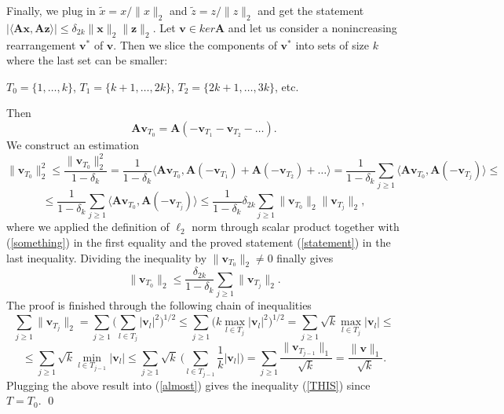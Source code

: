 \documentclass[11pt,american]{book} %
\theoremstyle{plain}
\theoremstyle{definition}
\begin{document}
Finally, we plug in $\tilde{x} = x/\lVert x\rVert_2$ and $\tilde{z} = z/\lVert z\rVert_2$ and get the statement $|\langle\bm{Ax},\bm{Az}\rangle| \leqslant \delta_{2k} \lVert \bm{x} \rVert_2 \lVert \bm{z} \rVert_2$.
\newline
\newline
Let $\bm{v} \in ker \bm{A}$ and let us consider a nonincreasing rearrangement $\bm{v}^*$ of $\bm{v}$. Then we slice the components of $\bm{v}^*$ into sets of size $k$ where the last set can be smaller:
\begin{center}
	$T_0 = \{1, \dots, k\}$, $T_1 = \{k+1, \dots, 2k\}$, $T_2 = \{2k+1, \dots, 3k\}$, etc.
\end{center}
Then
\begin{equation}
	\bm{A}\bm{v}_{T_0} = \bm{A}(-\bm{v}_{T_1}-\bm{v}_{T_2}- \dots). \label{something}
\end{equation}
We construct an estimation
\begin{equation*}
	\lVert\bm{v}_{T_0}\rVert_2^{2} \leqslant \frac{\lVert\bm{v}_{T_0}\rVert_2^{2}}{1-\delta_k} = \frac{1}{{1-\delta_k}}\langle\bm{A}\bm{v}_{T_0},\bm{A}(-\bm{v}_{T_1})+\bm{A}(-\bm{v}_{T_2}) + \dots\rangle = \frac{1}{{1-\delta_k}} \sum_{j\geqslant 1}\langle\bm{A}\bm{v}_{T_0},\bm{A}(-\bm{v}_{T_j}) \rangle \leqslant
\end{equation*}
\begin{equation*}
	\leqslant \frac{1}{{1-\delta_k}} \sum_{j\geqslant 1}\langle\bm{A}\bm{v}_{T_0},\bm{A}(-\bm{v}_{T_j})\rangle \leqslant \frac{1}{1-\delta_{k}} \delta_{2k} \sum_{j\geqslant 1} \lVert \bm{v}_{T_0}\rVert_2 \lVert \bm{v}_{T_j}\rVert_2,
\end{equation*}
where we applied the definition of $\ell_{2}$ norm through scalar product together with (\ref{something})  in the first equality and the proved statement (\ref{statement}) in the last inequality. Dividing the inequality by $\lVert\bm{v}_{T_0}\rVert_2 \neq 0$ finally gives
\begin{equation}
	\lVert\bm{v}_{T_0}\rVert_2 \leqslant \frac{\delta_{2k}}{1-\delta_{k}} \sum_{j\geqslant 1} \lVert \bm{v}_{T_j}\rVert_2. \label{almost}
\end{equation}
The proof is finished through the following chain of inequalities
\begin{equation*}
	\sum_{j\geqslant 1} \lVert\bm{v}_{T_j}\rVert_2 = \sum_{j\geqslant 1} \Big( \sum_{l \in T_j} |\bm{v}_l|^2 \Big)^{1/2} \leqslant \sum_{j\geqslant 1} \Big( k \max_{l \in T_j} |\bm{v}_l|^2 \Big)^{1/2} = \sum_{j\geqslant 1} \sqrt k \max_{l \in T_j} |\bm{v}_l| \leqslant 
\end{equation*}
\begin{equation*}
	\leqslant	\sum_{j\geqslant 1} \sqrt k \min_{l \in T_{j-1}} |\bm{v}_l|
	\leqslant \sum_{j\geqslant 1} \sqrt k \ \Big( \sum_{l \in T_{j-1}} \frac{1}{k} |\bm{v}_l| \Big) = \sum_{j\geqslant 1} \frac{\lVert \bm{v}_{T_{j-1}}\rVert_1}{\sqrt k} = \frac{\lVert \bm{v} \rVert_1}{\sqrt k}.
\end{equation*}
Plugging the above result into (\ref{almost}) gives the inequality (\ref{THIS}) since $T = T_0$.
\qed
\end{document}
